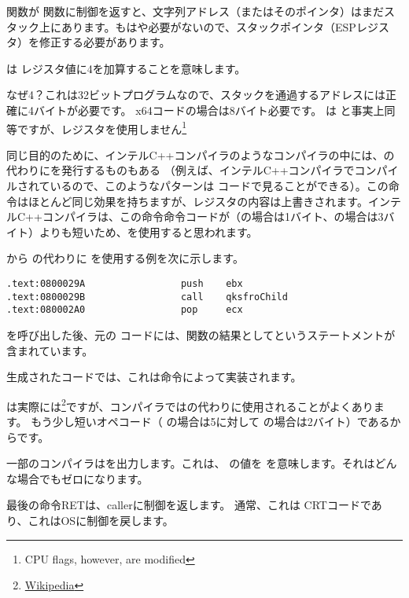 \printf 関数が \main 関数に制御を返すと、文字列アドレス（またはそのポインタ）はまだスタック上にあります。もはや必要がないので、スタックポインタ（ESPレジスタ）を修正する必要があります。

は \ESP レジスタ値に4を加算することを意味します。

なぜ4？これは32ビットプログラムなので、スタックを通過するアドレスには正確に4バイトが必要です。 x64コードの場合は8バイト必要です。
 は  と事実上同等ですが、レジスタを使用しません\footnote{CPU flags, however, are modified}

\myindex{\oracle}

同じ目的のために、インテルC++コンパイラのようなコンパイラの中には、\ADD の代わりにを発行するものもある
（例えば、インテルC++コンパイラでコンパイルされているので、このようなパターンは \oracle{} コードで見ることができる）。この命令はほとんど同じ効果を持ちますが、\ECX レジスタの内容は上書きされます。インテルC++コンパイラは、この命令命令コードが（の場合は1バイト、の場合は3バイト）よりも短いため、を使用すると思われます。

\oracle{} から \ADD の代わりに \POP を使用する例を次に示します。

\begin{lstlisting}[caption=\oracle 10.2 Linux (app.o file),style=customasmx86]
.text:0800029A                 push    ebx
.text:0800029B                 call    qksfroChild
.text:080002A0                 pop     ecx
\end{lstlisting}

\printf を呼び出した後、元の \CCpp コードには、\main 関数の結果としてというステートメントが含まれています。

生成されたコードでは、これは命令によって実装されます。


\XOR は実際には\footnote{\href{http://go.yurichev.com/17118}{Wikipedia}}ですが、コンパイラではの代わりに使用されることがよくあります。 もう少し短いオペコード（ \MOV の場合は5に対して \XOR の場合は2バイト）であるからです。

一部のコンパイラはを出力します。これは、 \EAX の値を \EAX {} を意味します。それはどんな場合でもゼロになります。

最後の命令RETは、\gls{caller}に制御を返します。 通常、これは \CCpp \ac{CRT}コードであり、これは\ac{OS}に制御を戻します。
